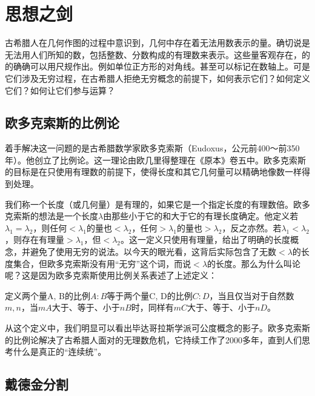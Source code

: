 \documentclass[b5paper]{ctexart}
\begin{document}
\section{思想之剑}

古希腊人在几何作图的过程中意识到，几何中存在着无法用数表示的量。确切说是无法用人们所知的数，包括整数、分数构成的有理数来表示。这些量客观存在，的的确确可以用尺规作出。例如单位正方形的对角线。甚至可以标记在数轴上。可是它们涉及无穷过程，在古希腊人拒绝无穷概念的前提下，如何表示它们？如何定义它们？如何让它们参与运算？

\subsection{欧多克索斯的比例论}

着手解决这一问题的是古希腊数学家欧多克索斯（Eudoxus，公元前400～前350年）。他创立了比例论。这一理论由欧几里得整理在《原本》卷五中。欧多克索斯的目标是在只使用有理数的前提下，使得长度和其它几何量可以精确地像数一样得到处理。

我们称一个长度（或几何量）是有理的，如果它是一个指定长度的有理数倍。欧多克索斯的想法是一个长度$\lambda$由那些小于它的和大于它的有理长度确定。他定义若$\lambda_1 = \lambda_2$，则任何$< \lambda_1$的量也$< \lambda_2$，任何$> \lambda_1$的量也$> \lambda_2$，反之亦然。若$\lambda_1 < \lambda_2$，则存在有理量$> \lambda_1$，但$< \lambda_2$。这一定义只使用有理量，给出了明确的长度概念，并避免了使用无穷的说法。以今天的眼光看，这背后实际包含了无数$< \lambda$的长度集合，但欧多克索斯没有用“无穷”这个词，而说$< \lambda$的长度。那么为什么叫论呢？这是因为欧多克索斯使用比例关系表述了上述定义：

\begin{definition}[欧多克索斯]
定义两个量A, B的比例$A:B$等于两个量C, D的比例$C:D$，当且仅当对于自然数$m, n$，当$mA$大于、等于、小于$nB$时，同样有$mC$大于、等于、小于$nD$。
\end{definition}

从这个定义中，我们明显可以看出毕达哥拉斯学派可公度概念的影子。欧多克索斯的比例论解决了古希腊人面对的无理数危机，它持续工作了2000多年，直到人们思考什么是真正的“连续统”。

\subsection{戴德金分割}
\end{document}
